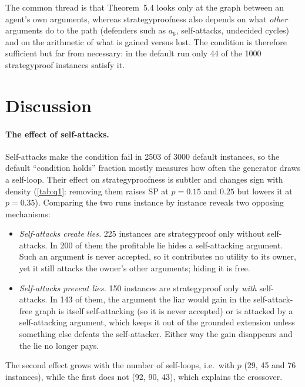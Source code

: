 \documentclass[11pt,a4paper]{article}
\theoremstyle{definition}
\begin{document}
The common thread is that Theorem~5.4 looks only at the graph between an agent's own arguments,
whereas strategyproofness also depends on what \emph{other} arguments do to the path (defenders such as
$a_6$, self-attacks, undecided cycles) and on the arithmetic of what is gained versus lost. The
condition is therefore sufficient but far from necessary: in the default run only 44 of the 1000
strategyproof instances satisfy it.

\section{Discussion}\label{sec:discussion}

\paragraph{The effect of self-attacks.} Self-attacks make the condition fail in 2503 of 3000 default
instances, so the default ``condition holds'' fraction mostly measures how often the generator draws a
self-loop. Their effect on strategyproofness is subtler and changes sign with density
(\cref{tab:q1}: removing them raises SP at $p=0.15$ and $0.25$ but lowers it at $p=0.35$). Comparing
the two runs instance by instance reveals two opposing mechanisms:
\begin{itemize}
  \item \emph{Self-attacks create lies.} 225 instances are strategyproof only without self-attacks. In
        200 of them the profitable lie hides a self-attacking argument. Such an argument is never
        accepted, so it contributes no utility to its owner, yet it still attacks the owner's other
        arguments; hiding it is free.
  \item \emph{Self-attacks prevent lies.} 150 instances are strategyproof only \emph{with}
        self-attacks. In 143 of them, the argument the liar would gain in the self-attack-free graph
        is itself self-attacking (so it is never accepted) or is attacked by a self-attacking
        argument, which keeps it out of the grounded extension unless something else defeats the
        self-attacker. Either way the gain disappears and the lie no longer pays.
\end{itemize}
The second effect grows with the number of self-loops, i.e.\ with $p$ (29, 45 and 76 instances),
while the first does not (92, 90, 43), which explains the crossover.
\end{document}
